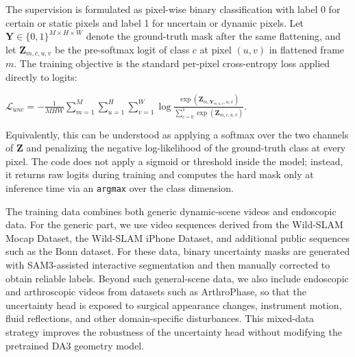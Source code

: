 The supervision is formulated as pixel-wise binary classification with label 0 for certain or static pixels and label 1 for uncertain or dynamic pixels. Let $\mathbf{Y}\in\{0,1\}^{M\times H\times W}$ denote the ground-truth mask after the same flattening, and let $\mathbf{Z}_{m,c,u,v}$ be the pre-softmax logit of class $c$ at pixel $(u,v)$ in flattened frame $m$. The training objective is the standard per-pixel cross-entropy loss applied directly to logits:
\begin{center}
    $\displaystyle
    \mathcal{L}_{unc}
    =
    - \frac{1}{MHW}
    \sum_{m=1}^{M}
    \sum_{u=1}^{H}
    \sum_{v=1}^{W}
    \log
    \frac{\exp\!\left(\mathbf{Z}_{m,\mathbf{Y}_{m,u,v},u,v}\right)}
         {\sum_{c=0}^{1}\exp\!\left(\mathbf{Z}_{m,c,u,v}\right)}.
    $
\end{center}
Equivalently, this can be understood as applying a softmax over the two channels of $\mathbf{Z}$ and penalizing the negative log-likelihood of the ground-truth class at every pixel. The code does not apply a sigmoid or threshold inside the model; instead, it returns raw logits during training and computes the hard mask only at inference time via an \texttt{argmax} over the class dimension.

The training data combines both generic dynamic-scene videos and endoscopic data. For the generic part, we use video sequences derived from the Wild-SLAM Mocap Dataset, the Wild-SLAM iPhone Dataset, and additional public sequences such as the Bonn dataset. For these data, binary uncertainty masks are generated with SAM3-assisted interactive segmentation and then manually corrected to obtain reliable labels. Beyond such general-scene data, we also include endoscopic and arthroscopic videos from datasets such as ArthroPhase, so that the uncertainty head is exposed to surgical appearance changes, instrument motion, fluid reflections, and other domain-specific disturbances. This mixed-data strategy improves the robustness of the uncertainty head without modifying the pretrained DA3 geometry model.
